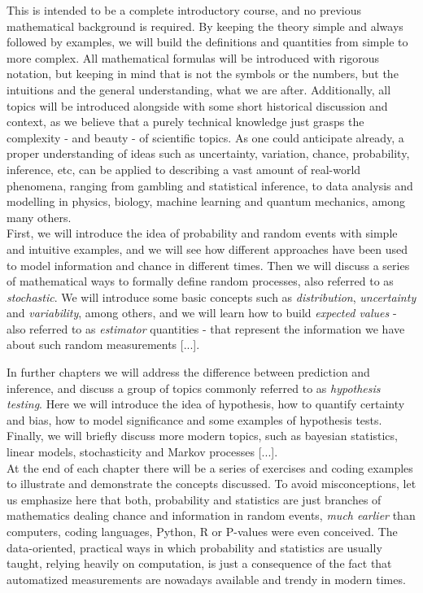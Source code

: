 \documentclass{book}
\begin{document}
This is intended to be a complete introductory course, and no previous mathematical background is required. By keeping the theory simple and always followed by examples, we will build the definitions and quantities from simple to more complex. All mathematical formulas will be introduced with rigorous notation, but keeping in mind that is not the symbols or the numbers, but the intuitions and the general understanding, what we are after. Additionally, all topics will be introduced alongside with some short historical discussion and context, as we believe that a purely technical knowledge just grasps the complexity - and beauty - of scientific topics. As one could anticipate already, a proper understanding of  ideas such as  uncertainty, variation, chance, probability, inference, etc, can be applied to describing a vast amount of real-world phenomena, ranging from gambling and statistical inference, to data analysis and modelling in physics, biology, machine learning and quantum mechanics, among many others. \\

First, we will introduce the idea of probability and random events with simple and intuitive examples, and we will see how different approaches have been used to model information and chance in different times. Then we will discuss a series of mathematical ways to formally define random processes, also referred to as \textit{stochastic}. We will introduce some basic concepts such as \textit{distribution}, \textit{uncertainty} and \textit{variability}, among others, and we will learn how to build \textit{expected values} - also referred to as \textit{estimator} quantities - that represent the information we have about such random measurements [...].

In further chapters we will address the difference between prediction and inference, and discuss a group of topics commonly referred to as \textit{hypothesis testing}. Here we will introduce the idea of hypothesis, how to quantify certainty and bias, how to model significance and some examples of hypothesis tests. Finally, we will briefly discuss more modern topics, such as bayesian statistics, linear models, stochasticity and Markov processes [...].\\

At the end of each chapter there will be a series of exercises and coding examples to illustrate and demonstrate the concepts discussed. To avoid misconceptions, let us emphasize here that both, probability and statistics are just branches of mathematics dealing chance and information in random events, \textit{much earlier} than computers, coding languages, Python, R or P-values were even conceived. The data-oriented, practical ways in which probability and statistics are usually taught, relying heavily on computation, is just a consequence of the fact that automatized measurements are nowadays available and trendy in modern times.\\
\end{document}
